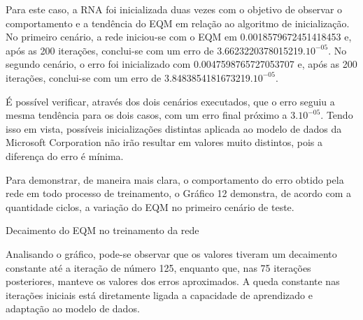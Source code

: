 Para este caso, a RNA foi inicializada duas vezes com o objetivo de observar o comportamento e a tendência do EQM em relação ao algoritmo de inicialização. No primeiro cenário, a rede iniciou-se com o EQM em 0.0018579672451418453 e, após as 200 iterações, conclui-se com um erro de 3.6623220378015219.$10^{-05}$. No segundo cenário, o erro foi inicializado com 0.0047598765727053707 e, após as 200 iterações, conclui-se com um erro de 3.8483854181673219.$10^{-05}$.

É possível verificar, através dos dois cenários executados, que o erro seguiu a mesma tendência para os dois casos, com um erro final próximo a 3.$10^{-05}$. Tendo isso em vista, possíveis inicializações distintas aplicada ao modelo de dados da Microsoft Corporation não irão resultar em valores muito distintos, pois a diferença do erro é mínima.

Para demonstrar, de maneira mais clara, o comportamento do erro obtido pela rede em todo processo de treinamento, o Gráfico 12 demonstra, de acordo com a quantidade ciclos, a variação do EQM no primeiro cenário de teste.
\begin{grafico}[h]
	\centering
	\caption{Decaimento do EQM no treinamento da rede}
	\label{lingua}
\end{grafico}

Analisando o gráfico, pode-se observar que os valores tiveram um decaimento constante até a iteração de número 125, enquanto que, nas 75 iterações posteriores, manteve os valores dos erros aproximados. A queda constante nas iterações iniciais está diretamente ligada a capacidade de aprendizado e adaptação ao modelo de dados.

